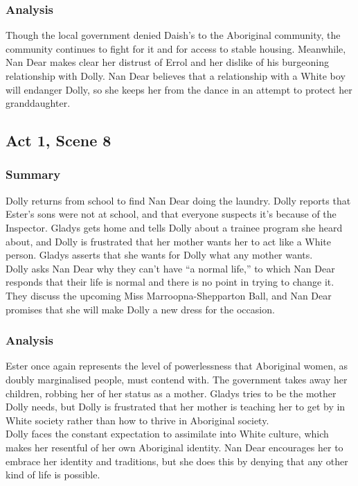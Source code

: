 \documentclass[a4paper]{article}
\begin{document}
\subsubsection{Analysis}
Though the local government denied Daish’s to the Aboriginal
community, the community continues to fight for it and for access
to stable housing. Meanwhile, Nan Dear makes clear her distrust of
Errol and her dislike of his burgeoning relationship with Dolly. Nan
Dear believes that a relationship with a White boy will endanger
Dolly, so she keeps her from the dance in an attempt to protect her
granddaughter.\\

\subsection{Act 1, Scene 8}
\subsubsection{Summary}
Dolly returns from school to find Nan Dear doing the laundry.
Dolly reports that Ester’s sons were not at school, and that
everyone suspects it’s because of the Inspector. Gladys gets
home and tells Dolly about a trainee program she heard about,
and Dolly is frustrated that her mother wants her to act like a
White person. Gladys asserts that she wants for Dolly what any
mother wants.\\

Dolly asks Nan Dear why they can’t have “a normal life,” to
which Nan Dear responds that their life is normal and there is
no point in trying to change it. They discuss the upcoming Miss
Marroopna-Shepparton Ball, and Nan Dear promises that she
will make Dolly a new dress for the occasion.\\

\subsubsection{Analysis}
Ester once again represents the level of powerlessness that
Aboriginal women, as doubly marginalised people, must contend
with. The government takes away her children, robbing her of her
status as a mother. Gladys tries to be the mother Dolly needs, but
Dolly is frustrated that her mother is teaching her to get by in White
society rather than how to thrive in Aboriginal society.\\

Dolly faces the constant expectation to assimilate into White
culture, which makes her resentful of her own Aboriginal identity.
Nan Dear encourages her to embrace her identity and traditions,
but she does this by denying that any other kind of life is possible.\\
\end{document}
